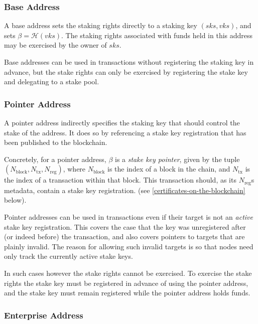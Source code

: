 \documentclass[11pt,a4paper]{article}
\begin{document}
\subsubsection{Base Address}\label{base-address}

A base address sets the staking rights directly to a staking key
\((sks, vks)\), and sets \(\beta = \mathcal{H}(vks)\). The staking
rights associated with funds held in this address may be exercised by
the owner of \(sks\).

Base addresses can be used in transactions without registering the
staking key in advance, but the stake rights can only be exercised by
registering the stake key and delegating to a stake pool.

\subsubsection{Pointer Address}\label{pointer-address}

A pointer address indirectly specifies the staking key that should
control the stake of the address. It does so by referencing a stake key
registration that has been published to the blockchain.

Concretely, for a pointer address, \(\beta\) is a \emph{stake key
pointer}, given by the tuple
\((N_\text{block}, N_\text{tx}, N_\text{reg})\), where
\(N_\text{block}\) is the index of a block in the chain, and
\(N_\text{tx}\) is the index of a transaction within that block. This
transaction should, as its \(N_\text{reg}\)s metadata, contain a stake
key registration. (see \ref{certificates-on-the-blockchain} below).

Pointer addresses can be used in transactions even if their target is
not an \emph{active} stake key registration. This covers the case that
the key was unregistered after (or indeed before) the transaction, and
also covers pointers to targets that are plainly invalid. The reason for
allowing such invalid targets is so that nodes need only track the
currently active stake keys.

In such cases however the stake rights cannot be exercised. To exercise
the stake rights the stake key must be registered in advance of using
the pointer address, and the stake key must remain registered while the
pointer address holds funds.

\subsubsection{Enterprise Address}\label{enterprise-address}
\end{document}

